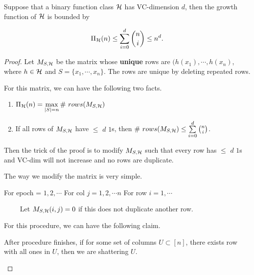 \documentclass[../main.tex]{subfiles}
\begin{document}
		\begin{theorem}
			Suppose that a binary function class $\mathcal{H}$ has VC-dimension $d$, then the growth function of $\mathcal{H}$ is bounded by
			
			\begin{equation}
			\Pi_{\mathcal{H}}(n) \leq \sum\limits_{i=0}^d \binom{n}{i} \leq n^d.
			\end{equation}
		\end{theorem}
		
		\begin{proof}
		
		Let $M_{S,\mathcal{H}}$ be the matrix whose \textbf{unique} rows are $(h(x_1),\cdots, h(x_n)$, where $h\in \mathcal{H}$ and $S = \{x_1,\cdots ,x_n\}$. The rows are unique by deleting repeated rows.
		
		For this matrix, we can have the following two facts.
		
		\begin{fact}
		
		\begin{enumerate}
		\item $\Pi_{\mathcal{H}}(n) = \max\limits_{|S| = n} \#\ rows(M_{S,\mathcal{H}})$
		
		\item If all rows of $M_{S,\mathcal{H}}$ have $\leq$ $d$ $1$s, then $\#\ rows(M_{S,\mathcal{H}})\leq \sum\limits_{i=0}^d \binom{n}{i}$.

		\end{enumerate}
		\end{fact}
		Then the trick of the proof is to modify $M_{S,\mathcal{H}}$ such that every row has $\leq$ $d$ $1$s and VC-dim will not increase and no rows are duplicate.
		
		The way we modify the matrix is very simple.
		
		\begin{algorithm}[H]
			\begin{algorithmic}
			\STATE For epoch = $1, 2,\cdots $
			\bindent
			\STATE For col $ j = 1, 2,\cdots n$
			\bindentt
			\STATE For row $i = 1,\cdots$
			
			\STATE $\qquad$ Let $M_{S,\mathcal{H}}(i,j) = 0$ if this does not duplicate another row.
			\eindentt
			\eindent
			\end{algorithmic}
		\end{algorithm}


		For this procedure, we can have the following claim.
		
		\begin{claim}
			After procedure finishes, if for some set of columns $U \subset [n]$, there exists row with all ones in $U$, then we are shattering $U$.
		\end{claim}
		

\end{proof}
\end{document}
